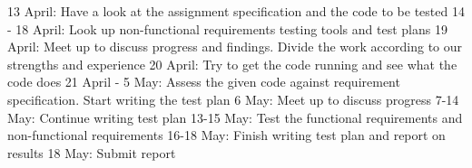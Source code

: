 13 April: Have a look at the assignment specification and the code to be tested
14 - 18 April: Look up non-functional requirements testing tools and test plans
19 April: Meet up to discuss progress and findings. Divide the work according to our strengths and experience
20 April: Try to get the code running and see what the code does
21 April - 5 May: Assess the given code against requirement specification. Start writing the test plan
6 May: Meet up to discuss progress
7-14 May: Continue writing test plan
13-15 May: Test the functional requirements and non-functional requirements
16-18 May: Finish writing test plan and report on results
18 May: Submit report 